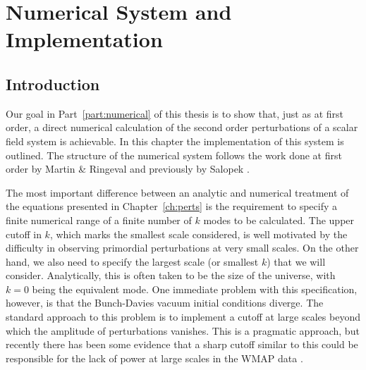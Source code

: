 \renewcommand{\CVSrevision}{\version$Id: numerical.tex,v 1.53 2009/11/29 12:44:59 ith Exp $}
% 

\chapter{Numerical System and Implementation}
\label{ch:numericalsystem}
% 
% 
\section{Introduction}
\label{sec:intro-num}

Our goal in Part~\ref{part:numerical} of this thesis is to show that, just as at
first
order, a direct numerical calculation of the second order perturbations of a
scalar field system is achievable. 
In this chapter the implementation of this system is outlined.
The structure of the numerical
system follows the work done at first order by Martin
\& Ringeval \cite{Martin:2006rs, Ringeval:2007am} and previously by
Salopek \etal \cite{Salopek:1988qh}.


The most important difference between an analytic and numerical treatment of the
equations presented in Chapter~\ref{ch:perts} is the requirement to specify a finite
numerical range of a finite number of $k$ modes to be calculated.
The upper cutoff in $k$, which marks the smallest scale considered, is well
motivated by the difficulty in observing primordial perturbations at very small
scales. 
On the other hand, we also need to specify the largest scale (or smallest $k$) that
we
will consider. Analytically, this is often taken to be the size of the universe,
with $k=0$ being the equivalent mode. One immediate problem with this
specification, however, is that
the Bunch-Davies vacuum initial conditions diverge. The standard approach to this
problem is to implement a cutoff
at large scales beyond which the amplitude of perturbations vanishes. This is a
pragmatic approach, but recently there has been some evidence that a sharp
cutoff similar to this could be responsible for the lack of power at large
scales in the WMAP data \cite{Lyth:2007jh, spergel, Sinha:2005mn,Kim:2009pf}.
 
